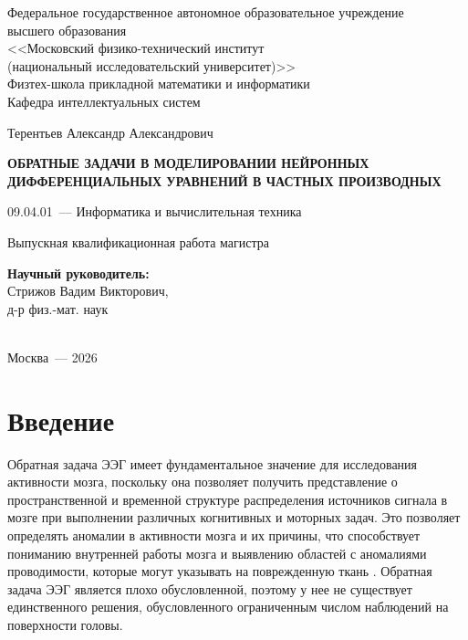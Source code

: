 \documentclass[a4paper,14pt,oneside,openany]{extarticle}
\begin{document}

\begin{center}
Федеральное государственное автономное образовательное учреждение\\ высшего образования\\
<<Московский физико-технический институт\\
(национальный исследовательский университет)>>\\
Физтех-школа прикладной математики и информатики\\
Кафедра интеллектуальных систем
\end{center}
%
\vspace{0pt plus5fill}
%
\begin{center}
\large{Терентьев Александр Александрович}
\end{center}
%
\vspace{0pt}
%
\begin{center}
\textbf{\large\MakeUppercase{Обратные задачи в моделировании нейронных дифференциальных уравнений в частных производных}}
\end{center}
%
\vspace{0pt}
%
\begin{center}
09.04.01~--- Информатика и вычислительная техника
\end{center}
%
\vspace{0pt}
%
\begin{center}
Выпускная квалификационная работа магистра
\end{center}
%
\vspace{0pt plus2fill}
%
\begin{center}
\hfill\parbox{8,4cm}{\textbf{Научный руководитель:}\\
Стрижов Вадим Викторович,\\
д-р физ.-мат. наук}\\
\vspace{0pt plus4fill}
Москва~--- 2026
\end{center}






\newpage
\section{Введение}

Обратная задача ЭЭГ имеет фундаментальное значение для исследования активности мозга, поскольку она
позволяет получить представление о пространственной и временной структуре распределения источников сигнала в мозге при выполнении
различных когнитивных и моторных задач. Это позволяет определять аномалии в активности мозга и их причины, 
что способствует пониманию внутренней работы мозга и выявлению областей с аномалиями проводимости, 
которые могут указывать на поврежденную ткань \cite{PascualMarqui2001}. 
Обратная задача ЭЭГ является плохо обусловленной, поэтому у нее не существует единственного
решения, обусловленного ограниченным числом наблюдений на поверхности головы.
\end{document}
